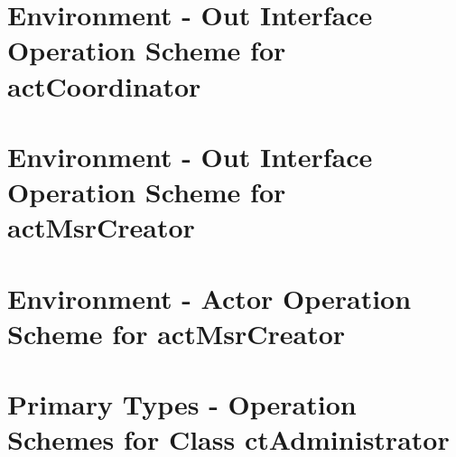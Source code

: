 \section{Environment - Out Interface Operation Scheme for actCoordinator}
\label{OM-EM-OutInterface-OS-actCoordinator}










\section{Environment - Out Interface Operation Scheme for actMsrCreator}
\label{OM-EM-OutInterface-OS-actMsrCreator}



		
\section{Environment - Actor Operation Scheme for actMsrCreator}
\label{OM-EM-actMsrCreator}
 



\section{Primary Types - Operation Schemes for Class ctAdministrator} 
\label{OM-CM-PTClass-ctAdministrator}

